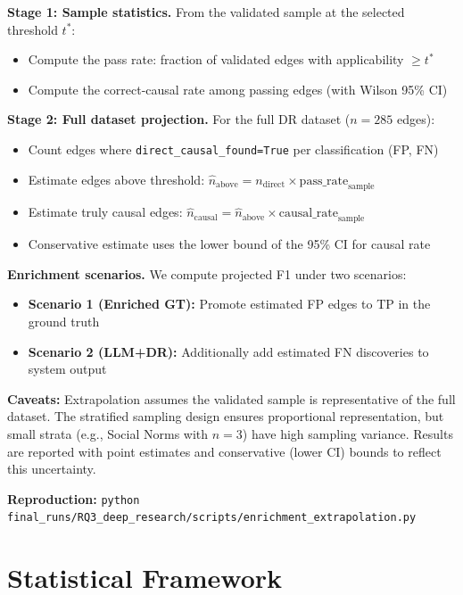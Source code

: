 \textbf{Stage 1: Sample statistics.} From the validated sample at the selected threshold $t^*$:
\begin{itemize}[noitemsep]
    \item Compute the pass rate: fraction of validated edges with applicability $\geq t^*$
    \item Compute the correct-causal rate among passing edges (with Wilson 95\% CI)
\end{itemize}

\textbf{Stage 2: Full dataset projection.} For the full DR dataset ($n=285$ edges):
\begin{itemize}[noitemsep]
    \item Count edges where \texttt{direct\_causal\_found=True} per classification (FP, FN)
    \item Estimate edges above threshold: $\hat{n}_{\text{above}} = n_{\text{direct}} \times \text{pass\_rate}_{\text{sample}}$
    \item Estimate truly causal edges: $\hat{n}_{\text{causal}} = \hat{n}_{\text{above}} \times \text{causal\_rate}_{\text{sample}}$
    \item Conservative estimate uses the lower bound of the 95\% CI for causal rate
\end{itemize}

\textbf{Enrichment scenarios.} We compute projected F1 under two scenarios:
\begin{itemize}[noitemsep]
    \item \textbf{Scenario 1 (Enriched GT):} Promote estimated FP edges to TP in the ground truth
    \item \textbf{Scenario 2 (LLM+DR):} Additionally add estimated FN discoveries to system output
\end{itemize}

\textbf{Caveats:} Extrapolation assumes the validated sample is representative of the full dataset. The stratified sampling design ensures proportional representation, but small strata (e.g., Social Norms with $n=3$) have high sampling variance. Results are reported with point estimates and conservative (lower CI) bounds to reflect this uncertainty.

\textbf{Reproduction:} \texttt{python final\_runs/RQ3\_deep\_research/scripts/enrichment\_extrapolation.py}

\section{Statistical Framework}
\label{sec:statistical_framework}

